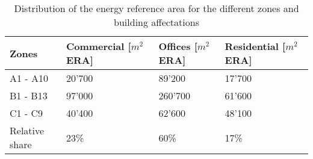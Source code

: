 \begin{table}[h!]
\centering
\caption{Distribution of the energy reference area for the different zones and building affectations}\vspace{2mm}
\label{tab:henchoz_area} 
\begin{tabular}{llll}
	\toprule
	Zones          & Commercial [$m^{2}$ ERA] & Offices  [$m^{2}$ ERA] & Residential  [$m^{2}$ ERA] \\ \midrule
	A1 - A10       & 20'700                   & 89'200                 & 17'700                     \\
	B1 - B13       & 97'000                   & 260'700                & 61'600                     \\
	C1 - C9        & 40'400                   & 62'600                 & 48'100                     \\ \midrule
	Relative share & 23\%                     & 60\%                   & 17\%                       \\ \bottomrule
\end{tabular}
\end{table}